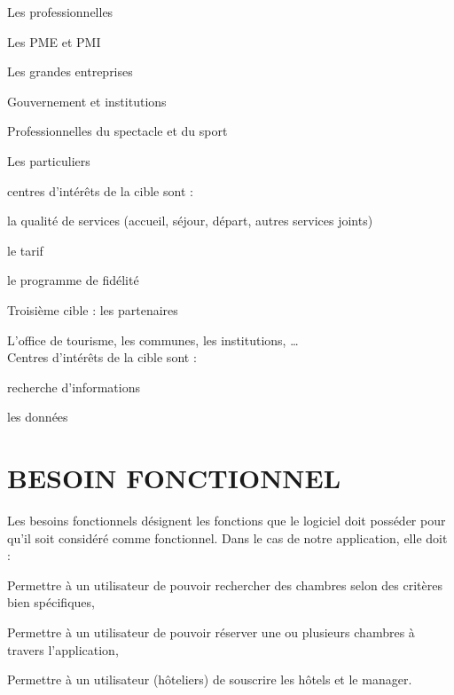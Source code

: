 \begin{list}{•}{ }
 \item Les professionnelles
   \begin{list}{-}{ }
     \item Les PME et PMI 
     \item Les grandes entreprises 
     \item Gouvernement et institutions 
     \item Professionnelles du spectacle et du sport
   \end{list}    
    

  \item Les particuliers 
  \item centres d’intérêts de la cible sont : 
   \begin{list}{-}{ }
   	\item la qualité de services (accueil, séjour, départ, autres services joints) 
    \item le tarif 
    \item le programme de fidélité 
   \end{list}
\end{list}

Troisième cible : les partenaires 
\begin{list}{•}{ }
	\item L’office de tourisme, les communes, les institutions, … \\
Centres d’intérêts de la cible sont : 
  \begin{list}{-}{ }
   \item recherche d’informations 
   \item les données
  \end{list}   
\end{list}

\section{BESOIN FONCTIONNEL}

Les besoins fonctionnels désignent les fonctions que le logiciel doit posséder pour qu’il soit considéré comme fonctionnel. Dans le cas de notre application, elle doit :
\begin{list}{•}{ }
  \item Permettre à un utilisateur de pouvoir rechercher des chambres selon des critères bien spécifiques,
  \item Permettre à un utilisateur de pouvoir réserver une ou plusieurs chambres à travers l’application,
  \item Permettre à un utilisateur (hôteliers) de souscrire les hôtels et le manager.
\end{list}

